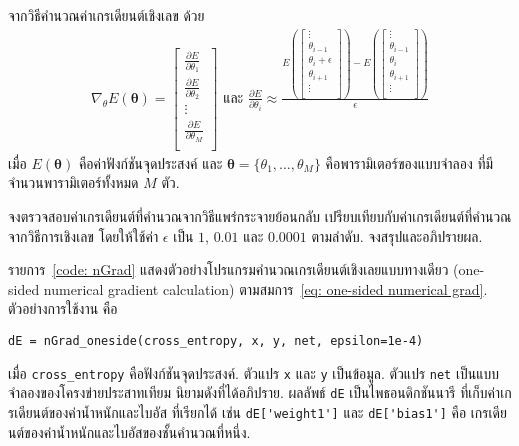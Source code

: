 \begin{Exercise}
	\label{ex: numerical gradient}

จากวิธีคำนวณค่าเกรเดียนต์เชิงเลข
ด้วย
\begin{eqnarray}
\nabla_{\theta} E(\bm{\theta}) = 
\begin{bmatrix}
\frac{\partial E}{\partial \theta_1} \\
\frac{\partial E}{\partial \theta_2} \\  
\vdots \\
\frac{\partial E}{\partial \theta_M} \\   
\end{bmatrix}
\mbox{ และ }
\frac{\partial E}{\partial \theta_i} \approx
\frac{E(\begin{bmatrix}
	\vdots \\
	\theta_{i-1} \\
	\theta_i + \epsilon \\
	\theta_{i+1} \\
	\vdots \\  
	\end{bmatrix})
	- E(\begin{bmatrix}
	\vdots \\
	\theta_{i-1} \\
	\theta_i \\
	\theta_{i+1} \\
	\vdots \\  
	\end{bmatrix})}{\epsilon}
\label{eq: one-sided numerical grad}  
\end{eqnarray}
เมื่อ $E(\bm{\theta})$ คือค่าฟังก์ชันจุดประสงค์
และ $\bm{\theta} = \{\theta_1, \ldots, \theta_M \}$ 
คือพารามิเตอร์ของแบบจำลอง ที่มีจำนวนพารามิเตอร์ทั้งหมด $M$ ตัว.

จงตรวจสอบค่าเกรเดียนต์ที่คำนวณจากวิธีแพร่กระจายย้อนกลับ
เปรียบเทียบกับค่าเกรเดียนต์ที่คำนวณจากวิธีการเชิงเลข
โดยให้ใช้ค่า $\epsilon$ เป็น $1$, $0.01$ และ $0.0001$ ตามลำดับ.
จงสรุปและอภิปรายผล.

รายการ~\ref{code: nGrad}
แสดงตัวอย่างโปรแกรมคำนวณเกรเดียนต์เชิงเลยแบบทางเดียว (one-sided numerical gradient calculation) ตามสมการ~\ref{eq: one-sided numerical grad}.
ตัวอย่างการใช้งาน คือ
\begin{Verbatim}[fontsize=\small]
dE = nGrad_oneside(cross_entropy, x, y, net, epsilon=1e-4)
\end{Verbatim}
เมื่อ \verb|cross_entropy|
คือฟังก์ชันจุดประสงค์. 
ตัวแปร \verb|x| และ \verb|y|
เป็นข้อมูล.
ตัวแปร \verb|net| เป็นแบบจำลองของโครงข่ายประสาทเทียม
นิยามดังที่ได้อภิปราย.
ผลลัพธ์ \verb|dE| เป็นไพธอนดิกชันนารี
ที่เก็บค่าเกรเดียนต์ของค่าน้ำหนักและไบอัส
ที่เรียกได้ เช่น
\verb|dE['weight1']| 
และ
\verb|dE['bias1']| 
คือ
เกรเดียนต์ของค่าน้ำหนักและไบอัสของชั้นคำนวณที่หนึ่ง.


\end{Exercise}


	
	